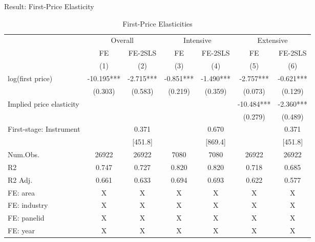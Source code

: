 \documentclass[
  ignorenonframetext,
  aspectratio=169,
]{beamer}
\begin{document}
\begin{frame}{Result: First-Price Elasticity}
\protect\hypertarget{result-first-price-elasticity}{}
\begin{table}

\caption{\label{tab:unnamed-chunk-12}First-Price Elasticities}
\centering
\fontsize{7}{9}\selectfont
\begin{tabular}[t]{lcccccc}
\toprule
\multicolumn{1}{c}{ } & \multicolumn{2}{c}{Overall} & \multicolumn{2}{c}{Intensive} & \multicolumn{2}{c}{Extensive} \\
\cmidrule(l{3pt}r{3pt}){2-3} \cmidrule(l{3pt}r{3pt}){4-5} \cmidrule(l{3pt}r{3pt}){6-7}
\multicolumn{1}{c}{ } & \multicolumn{1}{c}{FE} & \multicolumn{1}{c}{FE-2SLS} & \multicolumn{1}{c}{FE} & \multicolumn{1}{c}{FE-2SLS} & \multicolumn{1}{c}{FE} & \multicolumn{1}{c}{FE-2SLS} \\
\cmidrule(l{3pt}r{3pt}){2-2} \cmidrule(l{3pt}r{3pt}){3-3} \cmidrule(l{3pt}r{3pt}){4-4} \cmidrule(l{3pt}r{3pt}){5-5} \cmidrule(l{3pt}r{3pt}){6-6} \cmidrule(l{3pt}r{3pt}){7-7}
  & (1) & (2) & (3) & (4) & (5) & (6)\\
\midrule
log(first price) & -10.195*** & -2.715*** & -0.851*** & -1.490*** & -2.757*** & -0.621***\\
 & (0.303) & (0.583) & (0.219) & (0.359) & (0.073) & (0.129)\\
\midrule
Implied price elasticity &  &  &  &  & -10.484*** & -2.360***\\
 &  &  &  &  & (0.279) & (0.489)\\
First-stage: Instrument &  & 0.371 &  & 0.670 &  & 0.371\\
 &  & [451.8] &  & [869.4] &  & [451.8]\\
Num.Obs. & 26922 & 26922 & 7080 & 7080 & 26922 & 26922\\
R2 & 0.747 & 0.727 & 0.820 & 0.820 & 0.718 & 0.685\\
R2 Adj. & 0.661 & 0.633 & 0.694 & 0.693 & 0.622 & 0.577\\
FE: area & X & X & X & X & X & X\\
FE: industry & X & X & X & X & X & X\\
FE: panelid & X & X & X & X & X & X\\
FE: year & X & X & X & X & X & X\\
\bottomrule
\end{tabular}
\end{table}
\end{frame}
\end{document}
